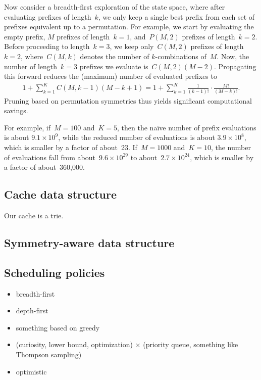 Now consider a breadth-first exploration of the state space,
where after evaluating prefixes of length~$k$, we only keep a single best prefix
from each set of prefixes equivalent up to a permutation.
%
For example, we start by evaluating the empty prefix,
$M$ prefixes of length~${k=1}$, and~${P(M, 2)}$ prefixes of length~${k=2}$.
%
Before proceeding to length~${k=3}$, we keep only~${C(M, 2)}$ prefixes of length~${k=2}$,
where~${C(M, k)}$ denotes the number of $k$-combinations of~$M$.
%
Now, the number of length~${k=3}$ prefixes we evaluate is~${C(M, 2) (M - 2)}$.
%
Propagating this forward reduces the (maximum) number of evaluated prefixes to
\begin{align}
1 + \sum_{k=1}^K C(M, k-1) (M - k + 1)
= 1 + \sum_{k=1}^K \frac{1}{(k - 1)!} \cdot \frac{M!}{(M - k)!}.
\end{align}
Pruning based on permutation symmetries thus yields significant computational savings.

For example, if~${M = 100}$ and~${K = 5}$, then the na\"ive number of prefix evaluations is
about ${9.1 \times 10^9}$, while the reduced number of evaluations is about ${3.9 \times 10^8}$,
which is smaller by a factor of about~23.
%
If~${M=1000}$ and~${K = 10}$, the number of evaluations fall from
about~${9.6 \times 10^{29}}$ to about~${2.7 \times 10^{24}}$,
which is smaller by a factor of about~360,000.
%

\subsection{Cache data structure}
\label{sec:cache}

Our cache is a trie.

\subsection{Symmetry-aware data structure}

\subsection{Scheduling policies}

\begin{itemize}
\item breadth-first
\item depth-first
\item something based on greedy
\item (curiosity, lower bound, optimization) $\times$ (priority queue, something like Thompson sampling)
\item optimistic
\end{itemize}

